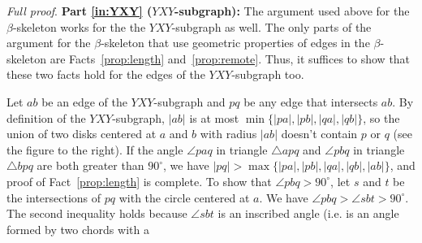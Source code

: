 \documentclass[final]{siamltex}
\newcommand{\dg}{^{\circ}}
\newcommand{\YXY}{YXY\xspace}
\newenvironment{fullproof}{\par{\it Full proof}. \ignorespaces}{\endproof}
\begin{document}
\begin{fullproof}
\noindent
{\bf Part \ref{in:YXY} ($\YXY$-subgraph):}
 The argument used above for the $\beta$-skeleton works for the the $\YXY$-subgraph as well.
The only parts of the argument for the $\beta$-skeleton that use geometric properties of 
edges in the $\beta$-skeleton are Facts~\ref{prop:length} and~\ref{prop:remote}.
Thus, it suffices to show that these two facts hold for the edges of the $\YXY$-subgraph too.
Let $a b$ be an edge of the $\YXY$-subgraph and $p q$ be any edge that intersects $a b$. 
By definition of the $\YXY$-subgraph,
$|a b|$ is at most $\min\{|p a|,|p b|,|q a|,|q b|\}$, so
the union of two disks centered at $a$ and $b$ with radius $|a b|$ doesn't contain $p$ 
or $q$ (see the figure to the right). 
If the angle $\angle p a q$ in triangle $\triangle a p q$ and $\angle p b q$ in triangle $\triangle b p q$
are both greater than $90\dg$, we have $|p q| > \max\{|p a|,|p b|,|q a|,|q b|,|a b|\}$,
and proof of Fact~\ref{prop:length} is complete.
To show that $\angle p b q > 90\dg$, 
let $s$ and $t$ be the intersections of $pq$ with the circle centered at $a$.
We have $\angle p b q > \angle s b t > 90\dg$. The second inequality holds because
$\angle s b t$ is an inscribed angle (i.e. is an angle formed by two chords with a 

\end{window}
\end{fullproof}
\end{document}
